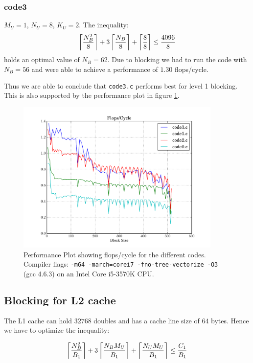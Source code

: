 \documentclass[portrait,a4paper]{article}
\begin{document}
\subsubsection{code3}
$M_U=1$, $N_U=8$, $K_U=2$. The inequality:
\begin{align*}
    \left\lceil {N_B^2 \over 8} \right\rceil + 3\left\lceil {N_B \over 8} \right\rceil
    + \left\lceil {8 \over 8} \right\rceil \leq {4096 \over 8}
\end{align*}
holds an optimal value of $N_B=62$. Due to blocking we had to run the code with $N_B=56$ and were able to achieve a performance of $1.30$ flops/cycle.

Thus we are able to conclude that \lstinline{code3.c} performs best for level 1 blocking. This is also supported by the performance plot in figure \ref{fig:flops_cycle}.

\begin{figure}[H]
    \centering
    \includegraphics[width=0.9\textwidth]{code/flops_cycle}
    \caption{Performance Plot showing flops/cycle for the different codes. Compiler flags: \texttt{-m64 -march=corei7 -fno-tree-vectorize -O3} (gcc 4.6.3) on an Intel Core i5-3570K CPU.}
    \label{fig:flops_cycle}
\end{figure}  

\subsection{Blocking for L2 cache}
The L1 cache can hold $32768$ doubles and has a cache line size of $64$ bytes. Hence we have to optimize the inequality:

\begin{align*}
    \left\lceil {N_B^2 \over B_1} \right\rceil + 3\left\lceil {N_B M_U \over B_1} \right\rceil
    + \left\lceil {N_U M_U \over B_1} \right\rceil \leq {C_1 \over B_1}
\end{align*}
\end{document}
